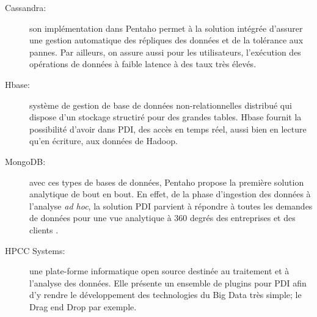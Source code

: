 \documentclass[12pt,a4wide,twoside]{report}
\begin{document}
\begin{itemize}
\begin{description}
\item[Cassandra:] son implémentation dans Pentaho permet à la solution intégrée d'assurer une gestion automatique des répliques des données et de la tolérance aux pannes. Par ailleurs, on assure aussi pour les utilisateurs, l'exécution des opérations de données à faible latence à des taux très élevés.  

\item[Hbase:] système de gestion de base de données non-relationnelles distribué qui dispose d'un stockage structiré pour des grandes tables. Hbase fournit la possibilité d'avoir dans PDI, des accès en temps réel, aussi bien en lecture qu'en écriture, aux données de Hadoop.
	
\item[MongoDB:] avec ces types de bases de données, Pentaho propose la première solution analytique de bout en bout. En effet, de la phase d'ingestion des données à l'analyse \emph{ad hoc}, la solution PDI parvient à répondre à toutes les demandes de données pour une vue analytique à 360 degrés des entreprises et des clients \cite{misc6}.

\item[HPCC Systems:] une plate-forme informatique open source destinée au traitement et à l'analyse des données.\newline
Elle présente un ensemble de plugins pour PDI afin d'y rendre le développement des technologies du Big Data très simple; le Drag end Drop par exemple.
\end{description}	
 \end{itemize}
\end{document}
